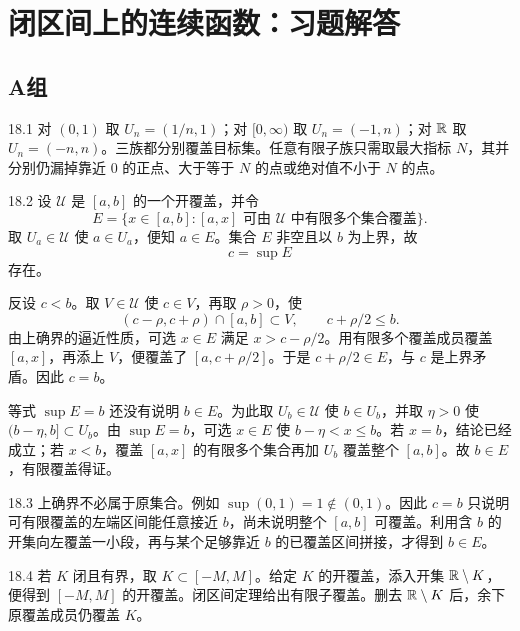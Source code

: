 \chapter{闭区间上的连续函数：习题解答}

\section*{A组}

\begin{solution}{18.1}
对 \((0,1)\) 取 \(U_n=(1/n,1)\)；对 \([0,\infty)\) 取 \(U_n=(-1,n)\)；对 \(\mathbb{R}\) 取 \(U_n=(-n,n)\)。三族都分别覆盖目标集。任意有限子族只需取最大指标 \(N\)，其并分别仍漏掉靠近 \(0\) 的正点、大于等于 \(N\) 的点或绝对值不小于 \(N\) 的点。
\end{solution}

\begin{solution}{18.2}
设 \(\mathcal U\) 是 \([a,b]\) 的一个开覆盖，并令
\[
 E=\{x\in[a,b]:[a,x]\text{ 可由 }\mathcal U\text{ 中有限多个集合覆盖}\}.
\]
取 \(U_a\in\mathcal U\) 使 \(a\in U_a\)，便知 \(a\in E\)。集合 \(E\) 非空且以 \(b\) 为上界，故
\[
 c=\sup E
\]
存在。

反设 \(c<b\)。取 \(V\in\mathcal U\) 使 \(c\in V\)，再取 \(\rho>0\)，使
\[
 (c-\rho,c+\rho)\cap[a,b]\subset V,
 \qquad c+\rho/2\le b.
\]
由上确界的逼近性质，可选 \(x\in E\) 满足 \(x>c-\rho/2\)。用有限多个覆盖成员覆盖 \([a,x]\)，再添上 \(V\)，便覆盖了 \([a,c+\rho/2]\)。于是 \(c+\rho/2\in E\)，与 \(c\) 是上界矛盾。因此 \(c=b\)。

等式 \(\sup E=b\) 还没有说明 \(b\in E\)。为此取 \(U_b\in\mathcal U\) 使 \(b\in U_b\)，并取 \(\eta>0\) 使 \((b-\eta,b]\subset U_b\)。由 \(\sup E=b\)，可选 \(x\in E\) 使 \(b-\eta<x\le b\)。若 \(x=b\)，结论已经成立；若 \(x<b\)，覆盖 \([a,x]\) 的有限多个集合再加 \(U_b\) 覆盖整个 \([a,b]\)。故 \(b\in E\)，有限覆盖得证。
\end{solution}

\begin{solution}{18.3}
上确界不必属于原集合。例如 \(\sup(0,1)=1\notin(0,1)\)。因此 \(c=b\) 只说明可有限覆盖的左端区间能任意接近 \(b\)，尚未说明整个 \([a,b]\) 可覆盖。利用含 \(b\) 的开集向左覆盖一小段，再与某个足够靠近 \(b\) 的已覆盖区间拼接，才得到 \(b\in E\)。
\end{solution}

\begin{solution}{18.4}
若 \(K\) 闭且有界，取 \(K\subset[-M,M]\)。给定 \(K\) 的开覆盖，添入开集 \(\mathbb{R}\setminus K\)，便得到 \([-M,M]\) 的开覆盖。闭区间定理给出有限子覆盖。删去 \(\mathbb{R}\setminus K\) 后，余下原覆盖成员仍覆盖 \(K\)。
\end{solution}

